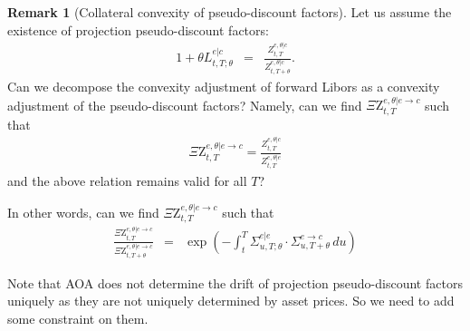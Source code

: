 \documentclass[11pt,english]{amsart}
\newcommand{\QZ}{{\Xi\mathrm{Z}}}
\theoremstyle{definition}
\newtheorem{rema}{Remark}
\begin{document}
\begin{rema}[Collateral convexity of pseudo-discount factors]
Let us assume the existence of projection pseudo-discount factors:
\begin{eqnarray}
  1+\theta L^{e|c}_{t,T;\theta}   &=& \frac{ Z^{e,\theta|c}_{t,T}  }{ Z^{e,\theta|c}_{t,T+\theta} } .
\end{eqnarray} 
Can we decompose the convexity adjustment of forward Libors as a convexity adjustment of the pseudo-discount factors? Namely, can we find $\QZ^{e,\theta|e\to c}_{t,T}$ such that  
\begin{eqnarray}
  \QZ^{e,\theta|e\to c}_{t,T} = \frac{ Z^{e,\theta|c}_{t,T}  }{ Z^{e,\theta|e}_{t,T} } 
\end{eqnarray} 
and the above relation remains valid for all $T$? 

In other words, can we find $\QZ^{e,\theta|e\to c}_{t,T}$ such that 
\begin{eqnarray}
    \frac{ \QZ^{e,\theta|e\to c}_{t,T}  }{ \QZ^{e,\theta|e\to c}_{t,T+\theta} }  
    &=&  \exp\left(  - \int_t^T \Sigma^{e|e}_{u,T;\theta}  \cdot  \Sigma^{e\to c}_{u,T+\theta} \, du \right)
\end{eqnarray} 

Note that AOA does not determine the drift of projection pseudo-discount factors uniquely as they are not uniquely determined by asset prices. So we need to add some constraint on them. 


\end{rema}
\end{document}
